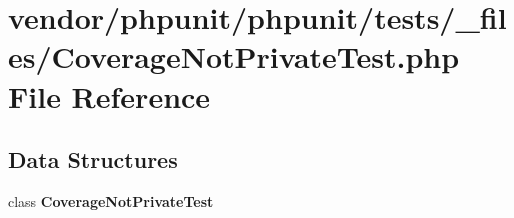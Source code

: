 \section{vendor/phpunit/phpunit/tests/\+\_\+files/\+Coverage\+Not\+Private\+Test.php File Reference}
\label{phpunit_2tests_2__files_2_coverage_not_private_test_8php}
\subsection*{Data Structures}
\begin{DoxyCompactItemize}
\item 
class {\bf Coverage\+Not\+Private\+Test}
\end{DoxyCompactItemize}
